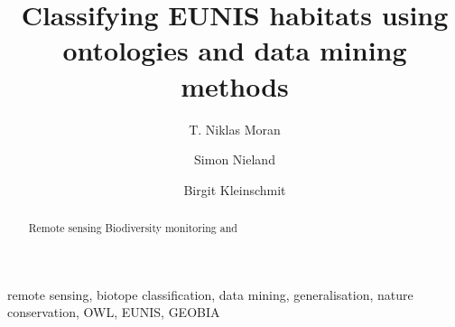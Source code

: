 \documentclass[authoryear, review,12pt,number]{elsarticle}
\begin{document}



\begin{frontmatter}
\linenumbers
\title{Classifying EUNIS habitats using ontologies and data mining methods}

\author[TUB]{T. Niklas Moran}

\author[TUB]{Simon Nieland}
\author[TUB]{Birgit Kleinschmit}

\address[TUB]{Geoinformation in Environmental Planning Lab, Technische
Universit\"at Berlin, Stra\ss e des 17. Juni 145, 10623 Berlin, Germany}


\begin{abstract}
  Remote sensing Biodiversity monitoring and 
\end{abstract}

\begin{keyword}
remote sensing, biotope classification, data mining,
generalisation, nature conservation, OWL, EUNIS, GEOBIA
\end{keyword}
\end{frontmatter}
\linenumbers
\end{document}
